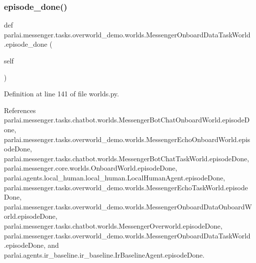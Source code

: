 \subsubsection{\texorpdfstring{episode\+\_\+done()}{episode\_done()}}
{\footnotesize\ttfamily def parlai.\+messenger.\+tasks.\+overworld\+\_\+demo.\+worlds.\+Messenger\+Onboard\+Data\+Task\+World.\+episode\+\_\+done (\begin{DoxyParamCaption}\item[{}]{self }\end{DoxyParamCaption})}



Definition at line 141 of file worlds.\+py.



References parlai.\+messenger.\+tasks.\+chatbot.\+worlds.\+Messenger\+Bot\+Chat\+Onboard\+World.\+episode\+Done, parlai.\+messenger.\+tasks.\+overworld\+\_\+demo.\+worlds.\+Messenger\+Echo\+Onboard\+World.\+episode\+Done, parlai.\+messenger.\+tasks.\+chatbot.\+worlds.\+Messenger\+Bot\+Chat\+Task\+World.\+episode\+Done, parlai.\+messenger.\+core.\+worlds.\+Onboard\+World.\+episode\+Done, parlai.\+agents.\+local\+\_\+human.\+local\+\_\+human.\+Local\+Human\+Agent.\+episode\+Done, parlai.\+messenger.\+tasks.\+overworld\+\_\+demo.\+worlds.\+Messenger\+Echo\+Task\+World.\+episode\+Done, parlai.\+messenger.\+tasks.\+overworld\+\_\+demo.\+worlds.\+Messenger\+Onboard\+Data\+Onboard\+World.\+episode\+Done, parlai.\+messenger.\+tasks.\+chatbot.\+worlds.\+Messenger\+Overworld.\+episode\+Done, parlai.\+messenger.\+tasks.\+overworld\+\_\+demo.\+worlds.\+Messenger\+Onboard\+Data\+Task\+World.\+episode\+Done, and parlai.\+agents.\+ir\+\_\+baseline.\+ir\+\_\+baseline.\+Ir\+Baseline\+Agent.\+episode\+Done.

\mbox{\label{classparlai_1_1messenger_1_1tasks_1_1overworld__demo_1_1worlds_1_1MessengerOnboardDataTaskWorld_ab6c20ceb59793b7b83752c2a46271e37}} 
